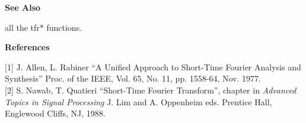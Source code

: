 {\bf \large {}\selectfont See Also}\\
\hspace*{1.5cm}
\begin{minipage}[t]{13.5cm}
all the {\ty tfr*} functions.
\end{minipage}
\vspace*{.5cm}

{\bf \large {}\selectfont References}\\
\hspace*{1.5cm}
\begin{minipage}[t]{13.5cm}
[1] J. Allen, L. Rabiner ``A Unified Approach to Short-Time Fourier
Analysis and Synthesis'' Proc. of the IEEE, Vol. 65, No. 11, pp. 1558-64,
Nov. 1977.\\

[2] S. Nawab, T. Quatieri ``Short-Time Fourier Transform'', chapter in {\it
Advanced Topics in Signal Processing} J. Lim and A. Oppenheim
eds. Prentice Hall, Englewood Cliffs, NJ, 1988.
\end{minipage}
